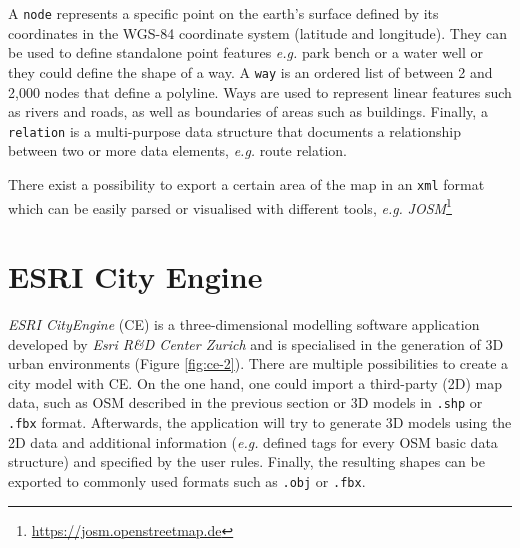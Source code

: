 A \texttt{node} represents a specific point on the earth's surface defined by its coordinates in the WGS-84 coordinate system (latitude and longitude). They can be used to define standalone point features \emph{e.g.} park bench or a water well or they could define the shape of a way. A \texttt{way} is an ordered list of between 2 and 2,000 nodes that define a polyline. Ways are used to represent linear features such as rivers and roads, as well as boundaries of areas such as buildings. Finally, a \texttt{relation} is a multi-purpose data structure that documents a relationship between two or more data elements, \emph{e.g.} route relation.

There exist a possibility to export a certain area of the map in an \texttt{xml} format which can be easily parsed or visualised with different tools, \emph{e.g.} \emph{JOSM}\footnote{\url{https://josm.openstreetmap.de}} 

\section{ESRI City Engine}
\label{ch:ce}
\emph{ESRI CityEngine} (CE) is a three-dimensional modelling software application developed by \emph{Esri R\&D Center Zurich} and is specialised in the generation of 3D urban environments (Figure \ref{fig:ce-2}). There are multiple possibilities to create a city model with CE. On the one hand, one could import a third-party (2D) map data, such as OSM described in the previous section or 3D models in \texttt{.shp} or \texttt{.fbx} format. Afterwards, the application will try to generate 3D models using the 2D data and additional information (\emph{e.g.} defined tags for every OSM basic data structure) and specified by the user rules. Finally, the resulting shapes can be exported to commonly used formats such as \texttt{.obj} or \texttt{.fbx}.

